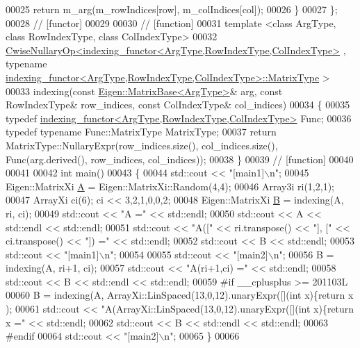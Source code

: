 \begin{DoxyCode}
00025     \textcolor{keywordflow}{return} m\_arg(m\_rowIndices[row], m\_colIndices[col]);
00026   \}
00027 \};
00028 \textcolor{comment}{// [functor]}
00029 
00030 \textcolor{comment}{// [function]}
00031 \textcolor{keyword}{template} <\textcolor{keyword}{class} ArgType, \textcolor{keyword}{class} RowIndexType, \textcolor{keyword}{class} ColIndexType>
00032 \hyperlink{group___core___module_class_eigen_1_1_cwise_nullary_op}{CwiseNullaryOp<indexing\_functor<ArgType,RowIndexType,ColIndexType>}
      , \textcolor{keyword}{typename} \hyperlink{group___core___module_class_eigen_1_1_matrix}{indexing\_functor<ArgType,RowIndexType,ColIndexType>::MatrixType}
      >
00033 indexing(\textcolor{keyword}{const} \hyperlink{group___core___module_class_eigen_1_1_matrix_base}{Eigen::MatrixBase<ArgType>}& arg, \textcolor{keyword}{const} RowIndexType& row\_indices, \textcolor{keyword}{
      const} ColIndexType& col\_indices)
00034 \{
00035   \textcolor{keyword}{typedef} \hyperlink{classindexing__functor}{indexing\_functor<ArgType,RowIndexType,ColIndexType>}
       Func;
00036   \textcolor{keyword}{typedef} \textcolor{keyword}{typename} Func::MatrixType MatrixType;
00037   \textcolor{keywordflow}{return} MatrixType::NullaryExpr(row\_indices.size(), col\_indices.size(), Func(arg.derived(), row\_indices, 
      col\_indices));
00038 \}
00039 \textcolor{comment}{// [function]}
00040 
00041 
00042 \textcolor{keywordtype}{int} main()
00043 \{
00044   std::cout << \textcolor{stringliteral}{"[main1]\(\backslash\)n"};
00045   Eigen::MatrixXi \hyperlink{group___core___module_class_eigen_1_1_matrix}{A} = Eigen::MatrixXi::Random(4,4);
00046   Array3i ri(1,2,1);
00047   ArrayXi ci(6); ci << 3,2,1,0,0,2;
00048   Eigen::MatrixXi \hyperlink{group___core___module_class_eigen_1_1_matrix}{B} = indexing(A, ri, ci);
00049   std::cout << \textcolor{stringliteral}{"A ="} << std::endl;
00050   std::cout << A << std::endl << std::endl;
00051   std::cout << \textcolor{stringliteral}{"A(["} << ri.transpose() << \textcolor{stringliteral}{"], ["} << ci.transpose() << \textcolor{stringliteral}{"]) ="} << std::endl;
00052   std::cout << B << std::endl;
00053   std::cout << \textcolor{stringliteral}{"[main1]\(\backslash\)n"};
00054 
00055   std::cout << \textcolor{stringliteral}{"[main2]\(\backslash\)n"};
00056   B =  indexing(A, ri+1, ci);
00057   std::cout << \textcolor{stringliteral}{"A(ri+1,ci) ="} << std::endl;
00058   std::cout << B << std::endl << std::endl;
00059 \textcolor{preprocessor}{#if \_\_cplusplus >= 201103L}
00060   B =  indexing(A, ArrayXi::LinSpaced(13,0,12).unaryExpr([](\textcolor{keywordtype}{int} x)\{\textcolor{keywordflow}{return} x%
      );
00061   std::cout << \textcolor{stringliteral}{"A(ArrayXi::LinSpaced(13,0,12).unaryExpr([](int x)\{return x%
       ="} << std::endl;
00062   std::cout << B << std::endl << std::endl;
00063 \textcolor{preprocessor}{#endif}
00064   std::cout << \textcolor{stringliteral}{"[main2]\(\backslash\)n"};
00065 \}
00066 
\end{DoxyCode}
